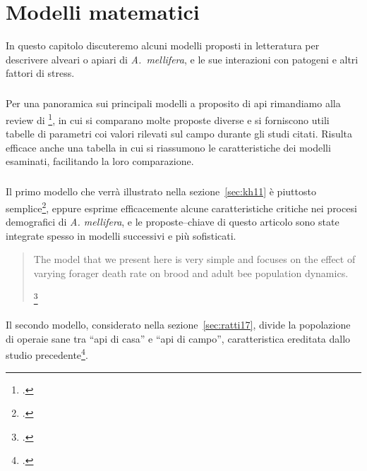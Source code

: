 \chapter{Modelli matematici}
\begin{flushright}
    \small
\end{flushright}

In questo capitolo discuteremo alcuni modelli proposti in letteratura per descrivere alveari o apiari di
\emph{A.~mellifera}, e le sue interazioni con patogeni e altri fattori di stress.

\paragraph{}
Per una panoramica sui principali modelli a proposito di api rimandiamo alla review di
\citeauthor{chen_review}\footcite{chen_review}, in cui si comparano molte proposte diverse e si forniscono utili
tabelle di parametri coi valori rilevati sul campo durante gli studi citati.
Risulta efficace anche una tabella in cui si riassumono le caratteristiche dei modelli esaminati, facilitando
la loro comparazione.

\paragraph{}
Il primo modello che verrà illustrato nella sezione~\ref{sec:kh11} è piuttosto
semplice\footcite{khoury2011}, eppure esprime efficacemente alcune
caratteristiche critiche nei procesi demografici di \emph{A. mellifera}, e le proposte--chiave di questo
articolo sono state integrate spesso in modelli successivi e più sofisticati.

\blockquote[{\footcite[4]{khoury2011}}]{The model that we present here is very simple and focuses on the effect
of varying forager death rate on brood and adult bee population dynamics.}

\paragraph{}
Il secondo modello, considerato nella sezione~\ref{sec:ratti17}, divide la popolazione di
operaie sane tra ``api di casa''
e ``api di campo'', caratteristica ereditata dallo studio precedente\footcite{khoury2011}.

